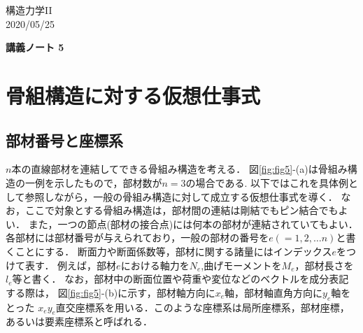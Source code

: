 \documentclass[10pt,a4j]{jarticle}
\newlength{\minitwocolumn}
\begin{document}
\newcommand{\fat}[1]{\mbox{\boldmath $#1$}}
\newcommand{\D}{\partial}
\newcommand{\w}{\omega}
\newcommand{\ga}{\alpha}
\newcommand{\gb}{\beta}
\newcommand{\gx}{\xi}
\newcommand{\gz}{\zeta}
\newcommand{\vhat}[1]{\hat{\fat{#1}}}
\newcommand{\spc}{\vspace{0.7\baselineskip}}
\newcommand{\halfspc}{\vspace{0.3\baselineskip}}

\newcommand{\twofig}[2]
 {
   \begin{figure}
     \begin{minipage}[t]{\minitwocolumn}
         \begin{center}   #1
         \end{center}
     \end{minipage}
         \hspace{\columnsep}
     \begin{minipage}[t]{\minitwocolumn}
         \begin{center} #2
         \end{center}
     \end{minipage}
   \end{figure}
 }
\begin{flushright}
	構造力学II\\
	2020/05/25
\end{flushright}
\begin{center}
	{\LARGE \bf 講義ノート 5} \\
\end{center}
\setcounter{section}{4}
\section{骨組構造に対する仮想仕事式}
\subsection{部材番号と座標系}
$n$本の直線部材を連結してできる骨組み構造を考える．
図\ref{fig:fig5}-(a)は骨組み構造の一例を示したもので，部材数が$n=3$の場合である. 
以下ではこれを具体例として参照しながら，一般の骨組み構造に対して成立する仮想仕事式を導く．
なお，ここで対象とする骨組み構造は，部材間の連結は剛結でもピン結合でもよい．
また，一つの節点(部材の接合点)には何本の部材が連結されていてもよい．
各部材には部材番号が与えられており，一般の部材の番号を$e(=1,2,\dots n)$と書くことにする．
断面力や断面係数等，部材に関する諸量にはインデックス$e$をつけて表す．
例えば，部材$e$における軸力を$N_e$,曲げモーメントを$M_e$，部材長さを$l_e$等と書く．
なお，部材中の断面位置や荷重や変位などのベクトルを成分表記する際は，
図\ref{fig:fig5}-(b)に示す，部材軸方向に$x_e$軸，部材軸直角方向に$y_e$軸をとった
$x_ey_e$直交座標系を用いる．このような座標系は局所座標系，部材座標，あるいは要素座標系と呼ばれる．
\end{document}
